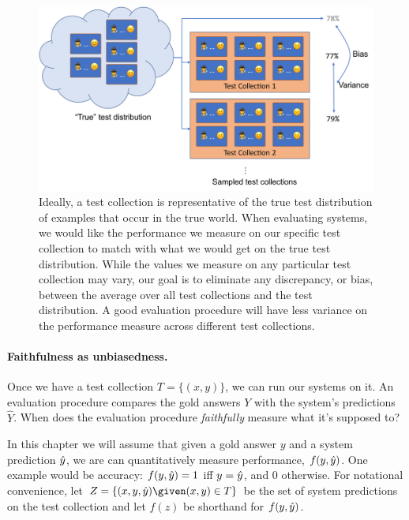 \begin{figure}
  \centering
  \includegraphics[width=\textwidth]{figures/bias}
  \caption[Bias and variance when evaluating with test collections]{\label{setup:bias} Ideally, a test collection is representative of the true test distribution of examples that occur in the true world.
  When evaluating systems, we would like the performance we measure on our specific test collection to match with what we would get on the true test distribution.
  While the values we measure on any particular test collection may vary, our goal is to eliminate any discrepancy, or bias, between the average over all test collections and the test distribution.
  A good evaluation procedure will have less variance on the performance measure across different test collections.
  }
\end{figure}

\paragraph{Faithfulness as unbiasedness.}
Once we have a test collection $T = \{(x, y)\}$, we can run our systems on it.
An evaluation procedure compares the gold answers $Y$ with the system's predictions $\hat{Y}$.
When does the evaluation procedure \textit{faithfully} measure what it's supposed to?

In this chapter we will assume that given a gold answer $y$ and a system prediction $\hat{y}$, we are can quantitatively measure performance, $f(y, \hat{y})$.
One example would be accuracy: $f(y, \hat{y}) = 1$ iff $y = \hat{y}$, and $0$ otherwise.
For notational convenience, let $Z = \{(x, y, \yh) \given (x, y) \in T\}$ be the set of system predictions on the test collection and let $f(z)$ be shorthand for $f(y, \hat{y})$.

